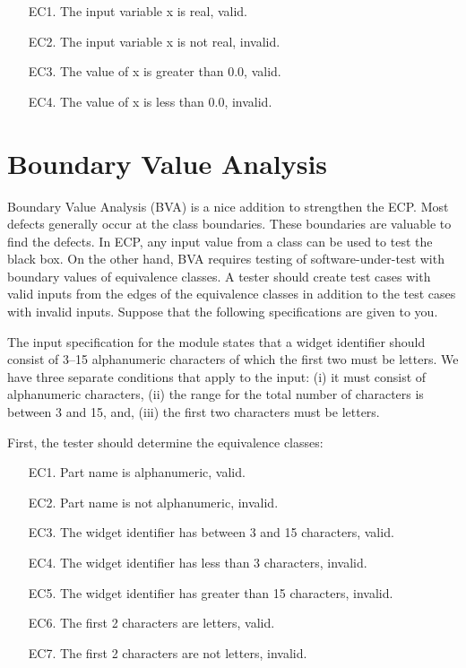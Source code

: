 \begin{enumerate}
    \item[EC1.] The input variable x is real, valid.
    \item[EC2.] The input variable x is not real, invalid.
    \item[EC3.] The value of x is greater than 0.0, valid.
    \item[EC4.] The value of x is less than 0.0, invalid.
\end{enumerate}

\section{Boundary Value Analysis}
Boundary Value Analysis (BVA) is a nice addition to strengthen the ECP. Most defects generally occur at the class boundaries. These boundaries are valuable to find the defects. In ECP, any input value from a class can be used to test the black box. On the other hand, BVA requires testing of software-under-test with boundary values of equivalence classes. A tester should create test cases with valid inputs from the edges of the equivalence classes in addition to the test cases with invalid inputs. Suppose that the following specifications \autocite{burnstein2006practical} are given to you.

\begin{displayquote}
    The input specification for the module states that a widget identifier should consist of 3–15 alphanumeric characters of which the first two must be letters. We have three separate conditions that apply to the input: (i) it must consist of alphanumeric characters, (ii) the range for the total number of characters is between 3 and 15, and, (iii) the first two characters must be letters.
\end{displayquote}

First, the tester should determine the equivalence classes:
\begin{enumerate}
    \item[EC1.] Part name is alphanumeric, valid.
    \item[EC2.] Part name is not alphanumeric, invalid.
    \item[EC3.] The widget identifier has between 3 and 15 characters, valid.
    \item[EC4.] The widget identifier has less than 3 characters, invalid.
    \item[EC5.] The widget identifier has greater than 15 characters, invalid.
    \item[EC6.] The first 2 characters are letters, valid.
    \item[EC7.] The first 2 characters are not letters, invalid.
\end{enumerate}

